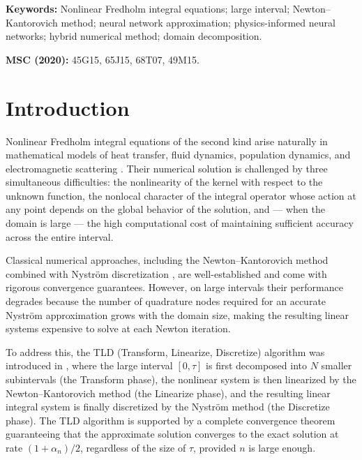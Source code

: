 \documentclass[12pt, a4paper]{article}
\begin{document}
\textbf{Keywords:} Nonlinear Fredholm integral equations;
large interval; Newton--Kantorovich method; neural network
approximation; physics-informed neural networks;
hybrid numerical method; domain decomposition.

\textbf{MSC (2020):} 45G15, 65J15, 68T07, 49M15.

\newpage

\section{Introduction}
\label{sec:intro}

Nonlinear Fredholm integral equations of the second kind arise
naturally in mathematical models of heat transfer, fluid
dynamics, population dynamics, and electromagnetic scattering
\cite{atkinson1997, ladopoulos2000}.
Their numerical solution is challenged by three simultaneous
difficulties: the nonlinearity of the kernel with respect to
the unknown function, the nonlocal character of the integral
operator whose action at any point depends on the global
behavior of the solution, and --- when the domain is large ---
the high computational cost of maintaining sufficient accuracy
across the entire interval.

Classical numerical approaches, including the
Newton--Kantorovich method combined with Nystr\"{o}m
discretization \cite{atkinson1997, grammont2013, grammont2014},
are well-established and come with rigorous convergence
guarantees.
However, on large intervals their performance degrades
because the number of quadrature nodes required for an
accurate Nystr\"{o}m approximation grows with the domain size,
making the resulting linear systems expensive to solve at
each Newton iteration.

To address this, the TLD (Transform, Linearize, Discretize)
algorithm was introduced in \cite{sedka2025}, where the large
interval $[0, \tau]$ is first decomposed into $N$ smaller
subintervals (the Transform phase), the nonlinear system is
then linearized by the Newton--Kantorovich method (the
Linearize phase), and the resulting linear integral system is
finally discretized by the Nystr\"{o}m method (the Discretize
phase).
The TLD algorithm is supported by a complete convergence
theorem guaranteeing that the approximate solution converges
to the exact solution at rate $(1 + \alpha_n)/2$, regardless
of the size of $\tau$, provided $n$ is large enough.
\end{document}
